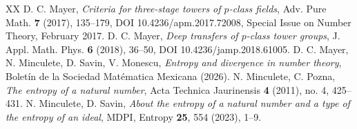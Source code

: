 \documentclass{amsart}
\theoremstyle{definition}
\theoremstyle{remark}
\begin{document}
\begin{thebibliography}{XX}
%
D. C. Mayer,
\textit{Criteria for three-stage towers of \(p\)-class fields},
Adv. Pure Math.
\textbf{7}
(2017),
135--179,
DOI 10.4236/apm.2017.72008,
Special Issue on Number Theory,
February 2017.
%
D. C. Mayer,
\textit{Deep transfers of \(p\)-class tower groups},
J. Appl. Math. Phys.
\textbf{6}
(2018),
36--50,
DOI 10.4236/jamp.2018.61005.
%
D. C. Mayer, N. Minculete, D. Savin, V. Monescu,
\textit{Entropy and divergence in number theory},
Bolet\'in de la Sociedad Mat\'ematica Mexicana (2026).
%
N. Minculete, C. Pozna,
\textit{The entropy of a natural number},
Acta Technica Jaurinensis
\textbf{4}
(2011),
no. 4,
425--431.
%
N. Minculete, D. Savin, 
\textit{About the entropy of a natural number and a type of the entropy of an ideal},
MDPI, Entropy
\textbf{25}, 554
(2023),
1--9.
%
\end{thebibliography}

\end{document}
